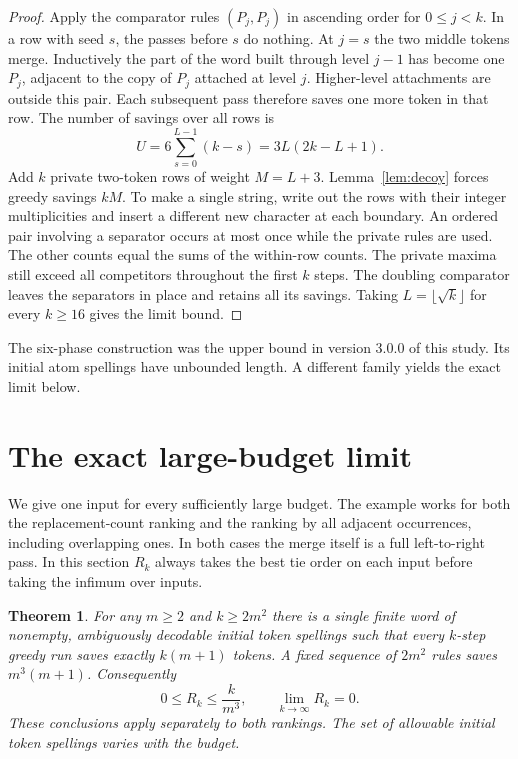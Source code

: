 \documentclass[11pt]{article}
\newtheorem{theorem}{Theorem}
\begin{document}
\begin{proof}
Apply the comparator rules $(P_j,P_j)$ in ascending order for $0\le j<k$. In a row with seed $s$, the passes before $s$ do nothing. At $j=s$ the two middle tokens merge. Inductively the part of the word built through level $j-1$ has become one $P_j$, adjacent to the copy of $P_j$ attached at level $j$. Higher-level attachments are outside this pair. Each subsequent pass therefore saves one more token in that row. The number of savings over all rows is
\[
U=6\sum_{s=0}^{L-1}(k-s)=3L(2k-L+1).
\]
Add $k$ private two-token rows of weight $M=L+3$. Lemma~\ref{lem:decoy} forces greedy savings $kM$. To make a single string, write out the rows with their integer multiplicities and insert a different new character at each boundary. An ordered pair involving a separator occurs at most once while the private rules are used. The other counts equal the sums of the within-row counts. The private maxima still exceed all competitors throughout the first $k$ steps. The doubling comparator leaves the separators in place and retains all its savings. Taking $L=\lfloor\sqrt{k}\rfloor$ for every $k\ge16$ gives the limit bound.
\end{proof}
The six-phase construction was the upper bound in version 3.0.0 of this study. Its initial atom spellings have unbounded length. A different family yields the exact limit below.

\section{The exact large-budget limit}
We give one input for every sufficiently large budget. The example works for both the replacement-count ranking and the ranking by all adjacent occurrences, including overlapping ones. In both cases the merge itself is a full left-to-right pass. In this section $R_k$ always takes the best tie order on each input before taking the infimum over inputs.

\begin{theorem}\label{th:zero}
For any $m\ge2$ and $k\ge 2m^2$ there is a single finite word of nonempty, ambiguously decodable initial token spellings such that every $k$-step greedy run saves exactly $k(m+1)$ tokens. A fixed sequence of $2m^2$ rules saves $m^3(m+1)$. Consequently
\[
  0\le R_k\le \frac{k}{m^3},\qquad \lim_{k\to\infty} R_k=0.
\]
These conclusions apply separately to both rankings. The set of allowable initial token spellings varies with the budget.
\end{theorem}
\end{document}
